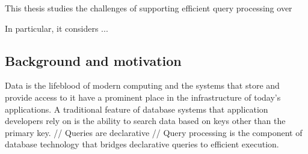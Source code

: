 


This thesis studies the challenges of supporting efficient query processing over

In particular, it considers ...

\subsection{Background and motivation}

Data is the lifeblood of modern computing and the systems that store and provide access to it have a prominent place in the infrastructure of today's applications.
A traditional feature of database systems that application developers rely on is the ability to search data based on keys other than the primary key.
// Queries are declarative //
Query processing is the component of database technology that bridges declarative queries to efficient execution.

